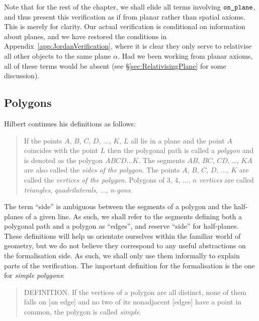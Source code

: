 Note that for the rest of the chapter, we shall elide all terms involving $\texttt{on\_plane}$, and thus present this verification as if from planar rather than spatial axioms. This is merely for clarity. Our actual verification is conditional on information about planes, and we have restored the conditions in Appendix~\ref{app:JordanVerification}, where it is clear they only serve to relativise all other objects to the same plane $\alpha$. Had we been working from planar axioms, all of these terms would be absent (see \S\ref{sec:RelativisingPlane} for some discussion).

\subsection{Polygons}\label{sec:polygonFormalisation}
Hilbert continues his definitions as follows:
\begin{quote}
  If the points $A$, $B$, $C$, $D$, $\ldots$, $K$, $L$ all lie in a plane and the point $A$ coincides with the point $L$ then the polygonal path is called a \emph{polygon} and is denoted as the polygon $ABCD\ldots K$. The segments $AB$, $BC$, $CD$, \ldots, $KA$ are also called the \emph{sides of the polygon}. The points $A$, $B$, $C$, $D$, $\ldots$, $K$ are called the \emph{vertices of the polygon.} Polygons of $3$, $4$, $\ldots$, $n$ \emph{vertices} are called \emph{triangles}, \emph{quadrilaterals}, $\ldots$, \emph{n-gons}.
\end{quote}

The term ``side'' is ambiguous between the segments of a polygon and the half-planes of a given line. As such, we shall refer to the segments defining both a polygonal path and a polygon as ``edges'', and reserve ``side'' for half-planes. These definitions will help us orientate ourselves within the familiar world of geometry, but we do not believe they correspond to any useful abstractions on the formalisation side. As such, we shall only use them informally to explain parts of the verification. The important definition for the formalisation is the one for \emph{simple polygons}:
\begin{quote}
  DEFINITION. If the vertices of a polygon are all distinct, none of them falls on [an edge] and no two of its nonadjacent [edges] have a point in common, the polygon is called \emph{simple}.
\end{quote}

